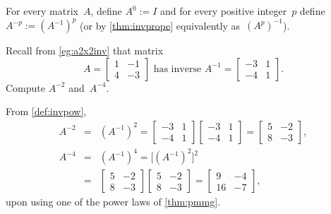 \begin{definition} \label{def:invpow} 
For every  matrix~\(A\), define \(A^0:=I\) and for every positive integer~\(p\) define \(A^{-p}:=(A^{-1})^p\) (or by \autoref{thm:invprope} equivalently as~\((A^p)^{-1}\)).
\end{definition}

\begin{example} \label{eg:a2x2negp}
Recall from \autoref{eg:a2x2inv} that matrix
\begin{equation*}
A=\begin{bmatrix} 1&-1\\4&-3 \end{bmatrix}
\text{ has inverse }
A^{-1}=\begin{bmatrix} -3&1\\-4&1 \end{bmatrix}.
\end{equation*}
Compute \(A^{-2}\) and~\(A^{-4}\).
\begin{solution} 
From \autoref{def:invpow},
\begin{eqnarray*}
A^{-2}&=&(A^{-1})^2
=\begin{bmatrix} -3&1\\-4&1 \end{bmatrix}\begin{bmatrix} -3&1\\-4&1 \end{bmatrix}
=\begin{bmatrix} 5&-2\\8&-3 \end{bmatrix},
\\
A^{-4}&=&(A^{-1})^4
=\big[(A^{-1})^2\big]^2
\\&=&\begin{bmatrix} 5&-2\\8&-3 \end{bmatrix}\begin{bmatrix} 5&-2\\8&-3 \end{bmatrix}
=\begin{bmatrix} 9&-4\\16&-7 \end{bmatrix},
\end{eqnarray*}
upon using one of the power laws of \autoref{thm:pmmg}.
\end{solution}
\end{example}



